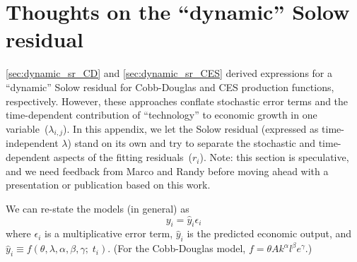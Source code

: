 \documentclass[preprint,authoryear,12pt]{elsarticle}\usepackage[]{graphicx}\usepackage[]{color}
\begin{document}
\section{Thoughts on the ``dynamic'' Solow residual}
\label{sec:thoughts_dynamic_sr}

\ref{sec:dynamic_sr_CD} and \ref{sec:dynamic_sr_CES} derived expressions
for a ``dynamic'' Solow residual 
for Cobb-Douglas and CES production functions, respectively.
However, these approaches conflate 
stochastic error terms and the time-dependent contribution of ``technology'' 
to economic growth
in one variable~($\lambda_{i,j}$).
In this appendix, we let the Solow residual 
(expressed as time-independent $\lambda$)
stand on its own and try to separate the stochastic and time-dependent
aspects of the fitting residuals~($r_i$).
Note: this section is speculative, and we need feedback from Marco and Randy 
before moving ahead with a presentation or publication based on this work.

We can re-state the models (in general) as
%
\begin{equation} \label{eq:general_y}
  y_i = \hat{y}_i \epsilon_i
\end{equation}
%
where $\epsilon_i$ is a multiplicative error term, 
$\hat{y}_i$ is the predicted economic output, and
$\hat{y}_i \equiv f(\theta, \lambda, \alpha, \beta, \gamma; \; t_i)$.
(For the Cobb-Douglas model, $f = \theta A k^\alpha l^\beta e^\gamma$.)
\end{document}
